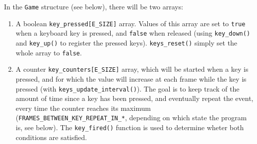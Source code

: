 \documentclass[12pt,a4paper]{article}
\newcommand{\cc}[1]{\texttt{#1}}
\begin{document}
In the \cc{Game} structure (see below), there will be two arrays:\begin{enumerate}
\item A boolean \cc{key_pressed[E_SIZE]} array. Values of this array are set to \cc{true} when a keyboard key is pressed, and \cc{false} when released (using \cc {key_down()} and \cc{key_up()} to register the pressed keys). \cc{keys_reset()} simply set the whole array to \cc{false}.
\item A counter \cc{key_counters[E_SIZE]} array, which will be started when a key is pressed, and for which the value will increase at each frame while the key is pressed (with \cc{keys_update_interval()}). The goal is to keep track of the amount of time since a key has been pressed, and eventually repeat the event, every time the counter reaches its maximum (\cc{FRAMES_BETWEEN_KEY_REPEAT_IN_*}, depending on which state the program is, see below). The \cc{key_fired()} function is used to determine wheter both conditions are satisfied.
\end{enumerate}
%
%
%
%
\end{document}

